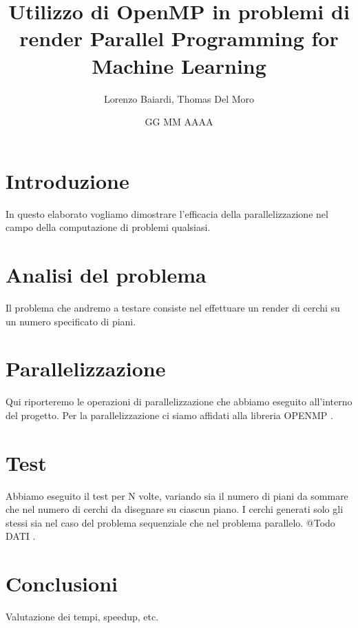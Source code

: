 \documentclass[11pt]{article}
\title{Utilizzo di OpenMP in problemi di render
Parallel Programming for Machine Learning}
\author{Lorenzo Baiardi, Thomas Del Moro}
\date{GG MM AAAA}
\begin{document}
    \maketitle
        \clearpage

    \tableofcontents
        \clearpage

    \section{Introduzione}\label{sec:introduzione}
        In questo elaborato vogliamo dimostrare l'efficacia della parallelizzazione nel campo della computazione di
        problemi qualsiasi.
        \clearpage

    \section{Analisi del problema}\label{sec:analisi-del-problema}
        Il problema che andremo a testare consiste nel effettuare un render di cerchi su un numero specificato di piani.
        \clearpage

    \section{Parallelizzazione}\label{sec:parallelizazzione}
        Qui riporteremo le operazioni di parallelizzazione che abbiamo eseguito all'interno del progetto.
        Per la parallelizzazione ci siamo affidati alla libreria OPENMP .
        \clearpage

    \section{Test}\label{sec:test}
        Abbiamo eseguito il test per N volte, variando sia il numero di piani da sommare che nel numero di cerchi
        da disegnare su ciascun piano.
        I cerchi generati solo gli stessi sia nel caso del problema sequenziale che nel problema parallelo.
        @Todo DATI .
        \clearpage

    \section{Conclusioni}\label{sec:conclusioni}
        Valutazione dei tempi, speedup, etc.
\end{document}
